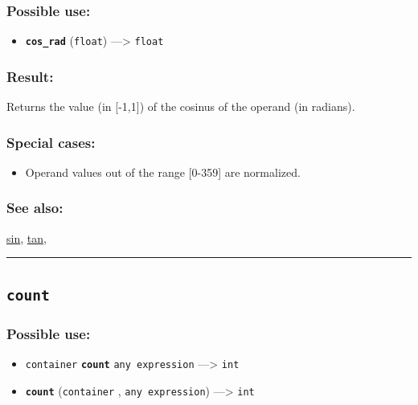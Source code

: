 \documentclass[]{book}
\providecommand{\tightlist}{%
  \setlength{\itemsep}{0pt}\setlength{\parskip}{0pt}}
\theoremstyle{definition}
\theoremstyle{definition}
\theoremstyle{definition}
\theoremstyle{remark}
\begin{document}
\subsubsection{Possible use:}\label{possible-use-111}

\begin{itemize}
\tightlist
\item
  \textbf{\texttt{cos\_rad}} (\texttt{float}) ---\textgreater{}
  \texttt{float}
\end{itemize}

\subsubsection{Result:}\label{result-108}

Returns the value (in {[}-1,1{]}) of the cosinus of the operand (in
radians).

\subsubsection{Special cases:}\label{special-cases-40}

\begin{itemize}
\tightlist
\item
  Operand values out of the range {[}0-359{]} are normalized.
\end{itemize}

\subsubsection{See also:}\label{see-also-68}

\href{operators-s-to-z.html\#sin}{sin},
\href{operators-s-to-z.html\#tan}{tan},

\begin{center}\rule{0.5\linewidth}{\linethickness}\end{center}

\subsection{\texorpdfstring{\texttt{count}}{count}}\label{count}

\subsubsection{Possible use:}\label{possible-use-112}

\begin{itemize}
\tightlist
\item
  \texttt{container} \textbf{\texttt{count}} \texttt{any\ expression}
  ---\textgreater{} \texttt{int}
\item
  \textbf{\texttt{count}} (\texttt{container} ,
  \texttt{any\ expression}) ---\textgreater{} \texttt{int}
\end{itemize}
\end{document}
